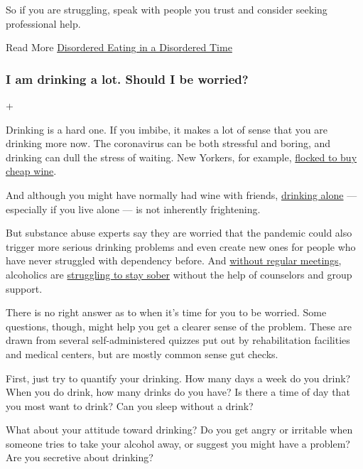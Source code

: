 So if you are struggling, speak with people you trust and consider
seeking professional help.

Read More
\href{https://www.nytimes3xbfgragh.onion/2020/06/05/health/eating-disorders-coronavirus.html}{Disordered
Eating in a Disordered Time}

\hypertarget{i-am-drinking-a-lot-should-i-be-worried}{%
\subsubsection{I am drinking a lot. Should I be
worried?}\label{i-am-drinking-a-lot-should-i-be-worried}}

+

Drinking is a hard one. If you imbibe, it makes a lot of sense that you
are drinking more now. The coronavirus can be both stressful and boring,
and drinking can dull the stress of waiting. New Yorkers, for example,
\href{https://www.nytimes3xbfgragh.onion/2020/04/23/nyregion/coronavirus-liquor-stores-nyc.html}{flocked
to buy cheap wine}.

And although you might have normally had wine with friends,
\href{https://www.nytimes3xbfgragh.onion/2020/03/16/dining/drinks/drinking-alone.html}{drinking
alone} --- especially if you live alone --- is not inherently
frightening.

But substance abuse experts say they are worried that the pandemic could
also trigger more serious drinking problems and even create new ones for
people who have never struggled with dependency before. And
\href{https://www.nytimes3xbfgragh.onion/2020/04/02/nyregion/coronavirus-alcoholics-anonymous-online.html}{without
regular meetings}, alcoholics are
\href{https://www.nytimes3xbfgragh.onion/2020/03/26/health/coronavirus-alcoholics-drugs-online.html}{struggling
to stay sober} without the help of counselors and group support.

There is no right answer as to when it's time for you to be worried.
Some questions, though, might help you get a clearer sense of the
problem. These are drawn from several self-administered quizzes put out
by rehabilitation facilities and medical centers, but are mostly common
sense gut checks.

First, just try to quantify your drinking. How many days a week do you
drink? When you do drink, how many drinks do you have? Is there a time
of day that you most want to drink? Can you sleep without a drink?

What about your attitude toward drinking? Do you get angry or irritable
when someone tries to take your alcohol away, or suggest you might have
a problem? Are you secretive about drinking?

